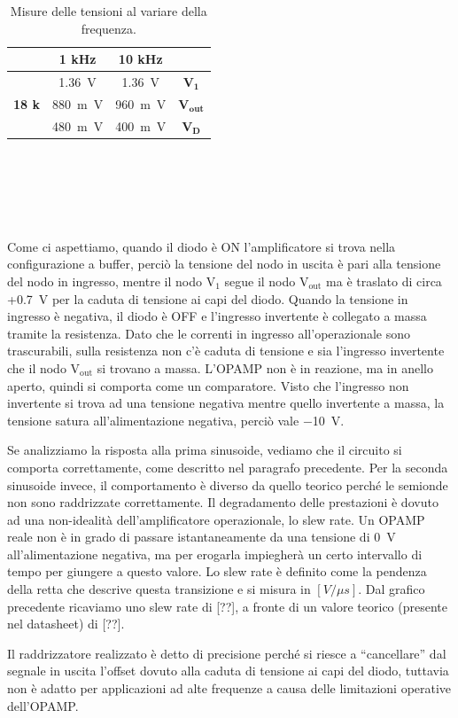 \documentclass{report}
\begin{document}
\begin{table}[h!]
	\centering
	\begin{tabular}{|c|c|c|c|}
		\cline{2-3} 
		\multicolumn{1}{c|}{} & \textbf{1 kHz} &  \textbf{10 kHz}  &\multicolumn{1}{c}{} \\ 
		\hline
		\multirow{3}{*}{\textbf{18 k\textOmega}} &  \SI{1.36}{\volt} & \SI{1.36}{\volt} & $\mathbf{V_{1}}$ \\
		\cline{2-4}
		& \SI{880}{m\volt} & \SI{960}{m\volt} & $\mathbf{V_{out}}$\\
		\cline{2-4}
		& \SI{480}{m\volt}  & \SI{400}{m\volt} & $\mathbf{V_D}$\\
		\hline
	\end{tabular}
	\caption{Misure delle tensioni al variare della frequenza.}
	\label{table:mis2}
\end{table}
\\\\\\\\\\Come ci aspettiamo, quando il diodo è ON l'amplificatore si trova nella configurazione a buffer, perciò la tensione del nodo in uscita è pari alla tensione del nodo in ingresso, mentre il nodo $\mathrm{V_1}$ segue il nodo $\mathrm{V_{out}}$ ma è traslato di circa +\SI{0.7}{\volt} per la caduta di tensione ai capi del diodo. Quando la tensione in ingresso è negativa, il diodo è OFF e l'ingresso invertente è collegato a massa tramite la resistenza. Dato che le correnti in ingresso all'operazionale sono trascurabili, sulla resistenza non c'è caduta di tensione e sia l'ingresso invertente che il nodo $\mathrm{V_{out}}$ si trovano a massa. L'OPAMP non è in reazione, ma in anello aperto, quindi si comporta come un comparatore. Visto che l'ingresso non invertente si trova ad una tensione negativa mentre quello invertente a massa, la tensione satura all'alimentazione negativa, perciò vale \SI{-10}{\volt}.\par
Se analizziamo la risposta alla prima sinusoide, vediamo che il circuito si comporta correttamente, come descritto nel paragrafo precedente. Per la seconda sinusoide invece, il comportamento è diverso da quello teorico perché le semionde non sono raddrizzate correttamente. Il degradamento delle prestazioni è dovuto ad una non-idealità dell'amplificatore operazionale, lo slew rate. Un OPAMP reale non è in grado di passare istantaneamente da una tensione di \SI{0}{\volt} all'alimentazione negativa, ma per erogarla impiegherà un certo intervallo di tempo per giungere a questo valore. Lo slew rate è definito come la pendenza della retta che descrive questa transizione e si misura in $[V/\mu s]$. Dal grafico precedente ricaviamo uno slew rate di [??], a fronte di un valore teorico (presente nel datasheet) di [??]. \par
Il raddrizzatore realizzato è detto di precisione perché si riesce a ``cancellare'' dal segnale in uscita l'offset dovuto alla caduta di tensione ai capi del diodo, tuttavia non è adatto per applicazioni ad alte frequenze a causa delle limitazioni operative dell'OPAMP. 
\newpage
\end{document}
